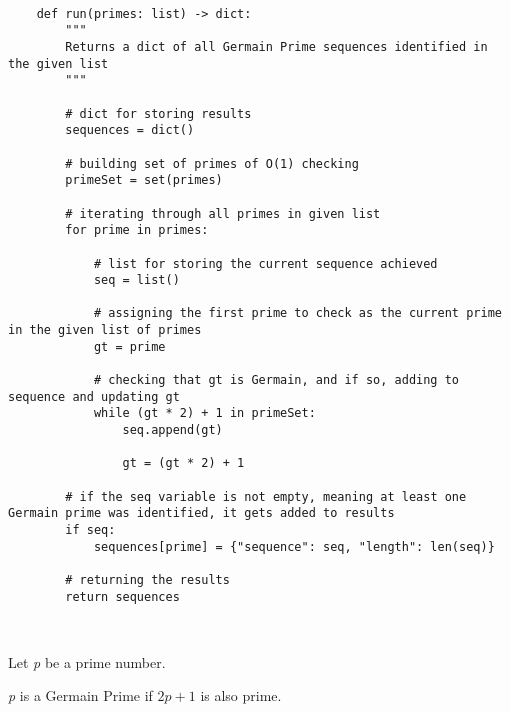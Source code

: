 \documentclass[11pt]{article}
\begin{document}
	
\lstset{style = Germain}

\begin{lstlisting}
	
	def run(primes: list) -> dict:
		"""
		Returns a dict of all Germain Prime sequences identified in the given list
		"""
	
		# dict for storing results
		sequences = dict()
		
		# building set of primes of O(1) checking
		primeSet = set(primes)
		
		# iterating through all primes in given list
		for prime in primes:
		
			# list for storing the current sequence achieved
			seq = list()
			
			# assigning the first prime to check as the current prime in the given list of primes
			gt = prime
			
			# checking that gt is Germain, and if so, adding to sequence and updating gt
			while (gt * 2) + 1 in primeSet:
				seq.append(gt)
				
				gt = (gt * 2) + 1
		
		# if the seq variable is not empty, meaning at least one Germain prime was identified, it gets added to results
		if seq:
			sequences[prime] = {"sequence": seq, "length": len(seq)}
		
		# returning the results
		return sequences

		
\end{lstlisting}


Let \textit{p} be a prime number.

\textit{p} is a Germain Prime if $2\textit{p}+1$ is also prime.
\end{document}
